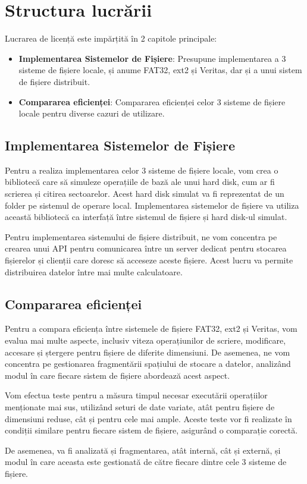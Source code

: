 \section{Structura lucrării}

Lucrarea de licență este impărțită în 2 capitole principale:

\begin{itemize}
  \item \textbf{ Implementarea Sistemelor de Fișiere}: Presupune implementarea a 3 sisteme de
  fișiere locale, și anume FAT32, ext2 și Veritas, dar și a unui sistem de fișiere distribuit.
  \item \textbf{ Compararea eficienței}: Compararea eficienței celor 3 sisteme de fișiere locale pentru diverse cazuri de utilizare.
\end{itemize}



\subsection{Implementarea Sistemelor de Fișiere}

Pentru a realiza implementarea celor 3 sisteme de fișiere locale, vom crea o bibliotecă care să simuleze operațiile de bază ale unui hard disk, cum ar fi scrierea și citirea sectoarelor. Acest hard disk simulat va fi reprezentat de un folder pe sistemul de operare local. Implementarea sistemelor de fișiere va utiliza această bibliotecă ca interfață între sistemul de fișiere și hard disk-ul simulat.

Pentru implementarea sistemului de fișiere distribuit, ne vom concentra pe crearea unui API pentru comunicarea între un server dedicat pentru stocarea fișierelor și clienții care doresc să acceseze aceste fișiere. Acest lucru va permite distribuirea datelor între mai multe calculatoare.

\subsection{Compararea eficienței}

Pentru a compara eficiența între sistemele de fișiere FAT32, ext2 și Veritas, vom evalua mai multe aspecte, inclusiv viteza operațiunilor de scriere, modificare, accesare și ștergere pentru fișiere de diferite dimensiuni. De asemenea, ne vom concentra pe gestionarea fragmentării spațiului de stocare a datelor, analizând modul în care fiecare sistem de fișiere abordează acest aspect.

Vom efectua teste pentru a măsura timpul necesar executării operațiilor menționate mai sus, utilizând seturi de date variate, atât pentru fișiere de dimensiuni reduse, cât și pentru cele mai ample. Aceste teste vor fi realizate în condiții similare pentru fiecare sistem de fișiere, asigurând o comparație corectă.

De asemenea, va fi analizată și fragmentarea, atât internă, cât și externă, și modul în care aceasta este gestionată de către fiecare dintre cele 3 sisteme de fișiere.
